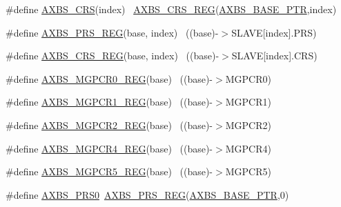 \begin{DoxyCompactItemize}
\item 
\#define \hyperlink{group___a_x_b_s___register___accessor___macros_ga4a8510c9fc2b213af3b61317c78f3252}{A\+X\+B\+S\+\_\+\+C\+RS}(index)                                                ~\hyperlink{group___a_x_b_s___register___accessor___macros_ga77c6588049d7ae23bbfd8c643a5adbed}{A\+X\+B\+S\+\_\+\+C\+R\+S\+\_\+\+R\+EG}(\hyperlink{group___a_x_b_s___peripheral_gacbbf56489b86d1ddb3e0ac291922a56d}{A\+X\+B\+S\+\_\+\+B\+A\+S\+E\+\_\+\+P\+TR},index)
\item 
\#define \hyperlink{group___a_x_b_s___register___accessor___macros_gadfe35678a94e899b6b19386de08d3472}{A\+X\+B\+S\+\_\+\+P\+R\+S\+\_\+\+R\+EG}(base,  index)                              ~((base)-\/$>$S\+L\+A\+VE\mbox{[}index\mbox{]}.P\+RS)
\item 
\#define \hyperlink{group___a_x_b_s___register___accessor___macros_ga77c6588049d7ae23bbfd8c643a5adbed}{A\+X\+B\+S\+\_\+\+C\+R\+S\+\_\+\+R\+EG}(base,  index)                              ~((base)-\/$>$S\+L\+A\+VE\mbox{[}index\mbox{]}.C\+RS)
\item 
\#define \hyperlink{group___a_x_b_s___register___accessor___macros_ga73d5437b701295ca86a3c050a866cf37}{A\+X\+B\+S\+\_\+\+M\+G\+P\+C\+R0\+\_\+\+R\+EG}(base)                                    ~((base)-\/$>$M\+G\+P\+C\+R0)
\item 
\#define \hyperlink{group___a_x_b_s___register___accessor___macros_gacbc3fc10e92190984302e2c4426afdd9}{A\+X\+B\+S\+\_\+\+M\+G\+P\+C\+R1\+\_\+\+R\+EG}(base)                                    ~((base)-\/$>$M\+G\+P\+C\+R1)
\item 
\#define \hyperlink{group___a_x_b_s___register___accessor___macros_gab08d4773427a7ffad127e4fc1c6cc024}{A\+X\+B\+S\+\_\+\+M\+G\+P\+C\+R2\+\_\+\+R\+EG}(base)                                    ~((base)-\/$>$M\+G\+P\+C\+R2)
\item 
\#define \hyperlink{group___a_x_b_s___register___accessor___macros_ga90e0d4d501d3b780839f0b6b2abb7f74}{A\+X\+B\+S\+\_\+\+M\+G\+P\+C\+R4\+\_\+\+R\+EG}(base)                                    ~((base)-\/$>$M\+G\+P\+C\+R4)
\item 
\#define \hyperlink{group___a_x_b_s___register___accessor___macros_ga4cd80d50972f855787c94c536aa9bf83}{A\+X\+B\+S\+\_\+\+M\+G\+P\+C\+R5\+\_\+\+R\+EG}(base)                                    ~((base)-\/$>$M\+G\+P\+C\+R5)
\item 
\#define \hyperlink{group___a_x_b_s___register___accessor___macros_ga51c41c430b9e769dba2e453a898544ec}{A\+X\+B\+S\+\_\+\+P\+R\+S0}~\hyperlink{group___a_x_b_s___register___accessor___macros_gadfe35678a94e899b6b19386de08d3472}{A\+X\+B\+S\+\_\+\+P\+R\+S\+\_\+\+R\+EG}(\hyperlink{group___a_x_b_s___peripheral_gacbbf56489b86d1ddb3e0ac291922a56d}{A\+X\+B\+S\+\_\+\+B\+A\+S\+E\+\_\+\+P\+TR},0)

\end{DoxyCompactItemize}
